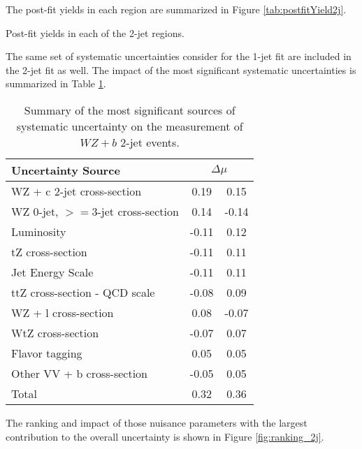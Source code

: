 The post-fit yields in each region are summarized in Figure \ref{tab:postfitYield2j}.

\begin{table}[H]
\begin{adjustwidth}{-3em}{-3em}
\small

\label{tab:postfitYield2j}
\caption{Post-fit yields in each of the 2-jet regions.}                                                         
\end{adjustwidth}
\end{table}

The same set of systematic uncertainties consider for the 1-jet fit are included in the 2-jet fit as well. The impact of the most significant systematic uncertainties is summarized in Table \ref{tab:systematics_2j}. 

\begin{table}[H]
    \centering
    \begin{tabular}{l|cc}
        \hline\hline
        Uncertainty Source & \multicolumn{2}{c}{$\Delta \mu$ }  \\
        \hline
        WZ + c 2-jet cross-section & 0.19 & 0.15 \\
        WZ 0-jet, $>=$3-jet cross-section & 0.14 & -0.14 \\
        Luminosity & -0.11 & 0.12 \\
        tZ cross-section & -0.11 & 0.11 \\
        Jet Energy Scale & -0.11 & 0.11 \\
        ttZ cross-section - QCD scale & -0.08 & 0.09 \\
        WZ + l cross-section & 0.08 & -0.07 \\
        WtZ cross-section & -0.07 & 0.07 \\
        Flavor tagging  & 0.05 & 0.05 \\
        Other VV + b cross-section & -0.05 & 0.05 \\
        \hline
        Total & 0.32 & 0.36 \\
        \hline\hline
    \end{tabular}
    \caption{Summary of the most significant sources of systematic uncertainty on the measurement of $WZ+b$ 2-jet events.}
    \label{tab:systematics_2j}
\end{table}

The ranking and impact of those nuisance parameters with the largest contribution to the overall uncertainty is shown in Figure \ref{fig:ranking_2j}.

